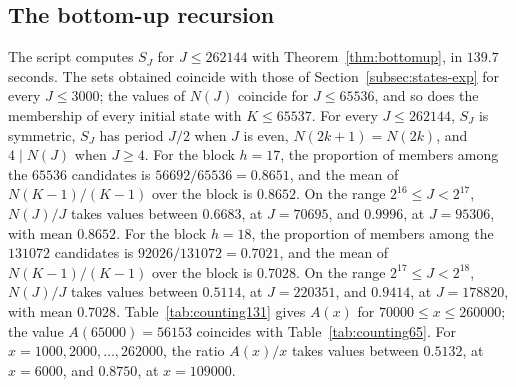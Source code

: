 \documentclass[11pt]{amsart}
\theoremstyle{definition}
\begin{document}
\subsection{The bottom-up recursion}
\label{subsec:bottomup-exp}
The script computes $S_J$ for $J\le262144$ with Theorem~\ref{thm:bottomup}, in $139.7$ seconds. The sets obtained coincide with those of Section~\ref{subsec:states-exp} for every $J\le3000$; the values of $N(J)$ coincide for $J\le65536$, and so does the membership of every initial state with $K\le65537$. For every $J\le262144$, $S_J$ is symmetric, $S_J$ has period $J/2$ when $J$ is even, $N(2k+1)=N(2k)$, and $4\mid N(J)$ when $J\ge4$. For the block $h=17$, the proportion of members among the $65536$ candidates is $56692/65536=0.8651$, and the mean of $N(K-1)/(K-1)$ over the block is $0.8652$. On the range $2^{16}\le J<2^{17}$, $N(J)/J$ takes values between $0.6683$, at $J=70695$, and $0.9996$, at $J=95306$, with mean $0.8652$. For the block $h=18$, the proportion of members among the $131072$ candidates is $92026/131072=0.7021$, and the mean of $N(K-1)/(K-1)$ over the block is $0.7028$. On the range $2^{17}\le J<2^{18}$, $N(J)/J$ takes values between $0.5114$, at $J=220351$, and $0.9414$, at $J=178820$, with mean $0.7028$. Table~\ref{tab:counting131} gives $A(x)$ for $70000\le x\le260000$; the value $A(65000)=56153$ coincides with Table~\ref{tab:counting65}. For $x=1000,2000,\dots,262000$, the ratio $A(x)/x$ takes values between $0.5132$, at $x=6000$, and $0.8750$, at $x=109000$.
\end{document}
